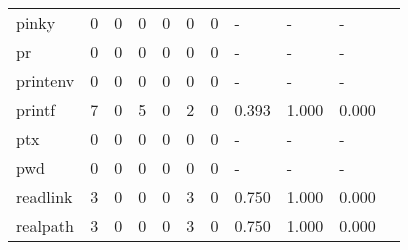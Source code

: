 \begin{longtable}{lp{1.10cm}p{1.10cm}p{1.10cm}p{1.10cm}p{1.10cm}p{1.10cm}p{1.10cm}p{1.10cm}p{1.10cm}p{1.10cm}}
pinky     &                      0 &                                  0 &                                 0 &                                0 &                                 0 &                               0 &                              - &                                     - &                                   - \\
pr        &                      0 &                                  0 &                                 0 &                                0 &                                 0 &                               0 &                              - &                                     - &                                   - \\
printenv  &                      0 &                                  0 &                                 0 &                                0 &                                 0 &                               0 &                              - &                                     - &                                   - \\
printf    &                      7 &                                  0 &                                 5 &                                0 &                                 2 &                               0 &                          0.393 &                                 1.000 &                               0.000 \\
ptx       &                      0 &                                  0 &                                 0 &                                0 &                                 0 &                               0 &                              - &                                     - &                                   - \\
pwd       &                      0 &                                  0 &                                 0 &                                0 &                                 0 &                               0 &                              - &                                     - &                                   - \\
readlink  &                      3 &                                  0 &                                 0 &                                0 &                                 3 &                               0 &                          0.750 &                                 1.000 &                               0.000 \\
realpath  &                      3 &                                  0 &                                 0 &                                0 &                                 3 &                               0 &                          0.750 &                                 1.000 &                               0.000 \\

\end{longtable}
